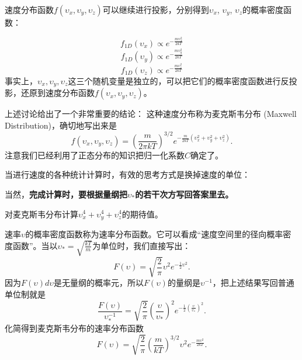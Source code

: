 \documentclass[CJK]{beamer}
\begin{document}
\begin{frame}
\bch
{\large
速度分布函数$f(\upsilon_x,\upsilon_y, \upsilon_z)$可以继续进行投影，分别得到$\upsilon_x$, $\upsilon_y$, $\upsilon_z$的概率密度函数：

$$ f_{1D}(\upsilon_x) \propto e^{-\frac{m\upsilon_x^2}{2kT}}$$
$$ f_{1D}(\upsilon_y)  \propto  e^{-\frac{m\upsilon_y^2}{2kT}}$$
$$ f_{1D}(\upsilon_z)  \propto e^{-\frac{m\upsilon_z^2}{2kT}}$$
事实上，{\blue $\upsilon_x,\upsilon_y, \upsilon_z$这三个随机变量是独立的}，可以把它们的概率密度函数进行反投影，还原到速度分布函数$f(\upsilon_x,\upsilon_y, \upsilon_z)$。
}
\ech
\end{frame}


\begin{frame}
\bch
    {\large
      上述讨论给出了一个非常重要的结论：
      这种速度分布称为{\blue 麦克斯韦分布 (Maxwell Distribution)}，确切地写出来是
      {\blue $$f(\upsilon_x,\upsilon_y, \upsilon_z) = \left(\frac{m}{2\pi kT}\right)^{3/2} e^{-\frac{m}{2kT}(\upsilon_x^2+\upsilon_y^2 + \upsilon_z^2)}.$$}
      注意我们已经利用了正态分布的知识把归一化系数$C$确定了。
}
\ech
\end{frame}


\begin{frame}
\bch
    {\large
      当进行速度的各种统计计算时，有效的思考方式是换掉速度的单位：

     当然，{\bf 完成计算时，要根据量纲把$\upsilon_*$的若干次方写回答案里去。}
}
\ech
\end{frame}


\begin{frame}
\bch
{}

对麦克斯韦分布计算$\upsilon_x^4+\upsilon_y^4+\upsilon_z^4$的期待值。
\ech
\end{frame}


\begin{frame}
\bch
速率$\upsilon$的概率密度函数称为{\blue 速率分布函数}。它可以看成“速度空间里的径向概率密度函数”。当以$\upsilon_* = \sqrt{\frac{kT}{m}}$为单位时，我们直接写出：
$$F(\upsilon) =\sqrt{\frac{2}{\pi}}\upsilon^2 e^{-\frac{1}{2}\upsilon^2}. $$
因为$F(\upsilon)d\upsilon$是无量纲的概率元，所以$F(\upsilon)$的量纲是$\upsilon^{-1}$，把上述结果写回普通单位制就是
$$ \frac{F(\upsilon)}{\upsilon_*^{-1}} = \sqrt{\frac{2}{\pi}}\left(\frac{\upsilon}{\upsilon_*}\right)^2 e^{-\frac{1}{2}\left(\frac{\upsilon}{\upsilon_*}\right)^2} .$$
化简得到{\blue 麦克斯韦分布的速率分布函数
$$F(\upsilon) = \sqrt{\frac{2}{\pi}}\left(\frac{m}{kT}\right)^{3/2}\upsilon^2e^{-\frac{m\upsilon^2}{2kT}} .$$}

\ech
\end{frame}
\end{document}
